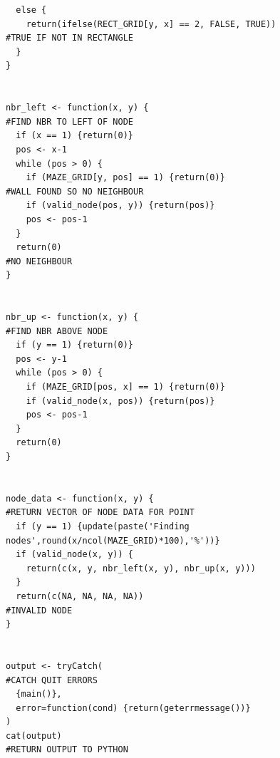 \documentclass[titlepage]{article}
\begin{document}
\begin{changemargin}{-1in}{-1in}
\begin{verbatim}
  else {
    return(ifelse(RECT_GRID[y, x] == 2, FALSE, TRUE))                           #TRUE IF NOT IN RECTANGLE
  }
}


nbr_left <- function(x, y) {                                                    #FIND NBR TO LEFT OF NODE
  if (x == 1) {return(0)}
  pos <- x-1
  while (pos > 0) {
    if (MAZE_GRID[y, pos] == 1) {return(0)}                                     #WALL FOUND SO NO NEIGHBOUR
    if (valid_node(pos, y)) {return(pos)}
    pos <- pos-1
  }
  return(0)                                                                     #NO NEIGHBOUR
}


nbr_up <- function(x, y) {                                                      #FIND NBR ABOVE NODE
  if (y == 1) {return(0)}
  pos <- y-1
  while (pos > 0) {
    if (MAZE_GRID[pos, x] == 1) {return(0)}
    if (valid_node(x, pos)) {return(pos)}
    pos <- pos-1
  }
  return(0)
}


node_data <- function(x, y) {                                                   #RETURN VECTOR OF NODE DATA FOR POINT
  if (y == 1) {update(paste('Finding nodes',round(x/ncol(MAZE_GRID)*100),'%'))}
  if (valid_node(x, y)) {
    return(c(x, y, nbr_left(x, y), nbr_up(x, y)))
  }
  return(c(NA, NA, NA, NA))                                                     #INVALID NODE
}


output <- tryCatch(                                                             #CATCH QUIT ERRORS
  {main()},
  error=function(cond) {return(geterrmessage())}
)
cat(output)                                                                     #RETURN OUTPUT TO PYTHON
\end{verbatim}
\end{changemargin} 


\pagebreak
\end{document}
